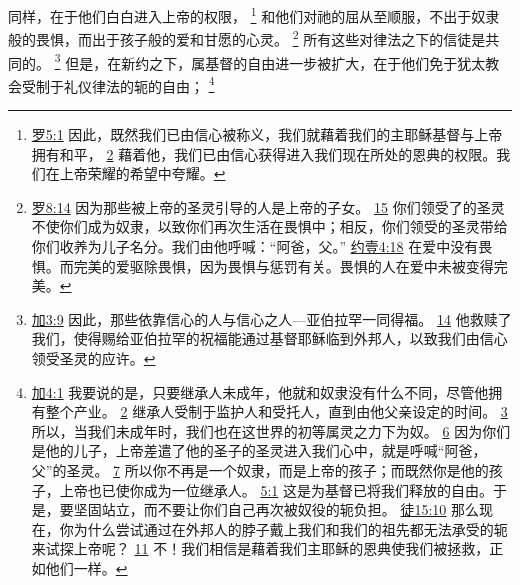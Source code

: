 \documentclass[12pt, a4paper, oneside]{ctexart}
\begin{document}
	同样，在于他们白白进入上帝的权限，
	\footnote {
		\href{https://biblehub.com/romans/5-1.htm}{罗5:1} 因此，既然我们已由信心被称义，我们就藉着我们的主耶稣基督与上帝拥有和平，
		\href{https://biblehub.com/romans/5-2.htm}{2} 藉着他，我们已由信心获得进入我们现在所处的恩典的权限。我们在上帝荣耀的希望中夸耀。

	}
	和他们对祂的屈从至顺服，不出于奴隶般的畏惧，而出于孩子般的爱和甘愿的心灵。
	\footnote {
		\href{https://biblehub.com/romans/8-14.htm}{罗8:14} 因为那些被上帝的圣灵引导的人是上帝的子女。
		\href{https://biblehub.com/romans/8-15.htm}{15} 你们领受了的圣灵不使你们成为奴隶，以致你们再次生活在畏惧中；相反，你们领受的圣灵带给你们收养为儿子名分。我们由他呼喊：“阿爸，父。”
		\href{https://biblehub.com/1_john/4-18.htm}{约壹4:18} 在爱中没有畏惧。而完美的爱驱除畏惧，因为畏惧与惩罚有关。畏惧的人在爱中未被变得完美。
	}
	所有这些对律法之下的信徒是共同的。
	\footnote {
		\href{https://biblehub.com/galatians/3-9.htm}{加3:9} 因此，那些依靠信心的人与信心之人---亚伯拉罕一同得福。
		\href{https://biblehub.com/galatians/3-14.htm}{14} 他救赎了我们，使得赐给亚伯拉罕的祝福能通过基督耶稣临到外邦人，以致我们由信心领受圣灵的应许。
	}
	但是，在新约之下，属基督的自由进一步被扩大，在于他们免于犹太教会受制于礼仪律法的轭的自由；
	\footnote {
		\href{https://biblehub.com/galatians/4-1.htm}{加4:1} 我要说的是，只要继承人未成年，他就和奴隶没有什么不同，尽管他拥有整个产业。
		\href{https://biblehub.com/galatians/4-2.htm}{2} 继承人受制于监护人和受托人，直到由他父亲设定的时间。
		\href{https://biblehub.com/galatians/4-3.htm}{3} 所以，当我们未成年时，我们也在这世界的初等属灵之力下为奴。
		\href{https://biblehub.com/galatians/4-6.htm}{6} 因为你们是他的儿子，上帝差遣了他的圣子的圣灵进入我们心中，就是呼喊“阿爸，父”的圣灵。
		\href{https://biblehub.com/galatians/4-7.htm}{7} 所以你不再是一个奴隶，而是上帝的孩子；而既然你是他的孩子，上帝也已使你成为一位继承人。
		\href{https://biblehub.com/galatians/5-1.htm}{5:1} 这是为基督已将我们释放的自由。于是，要坚固站立，而不要让你们自己再次被奴役的轭负担。
		\href{https://biblehub.com/acts/15-10.htm}{徒15:10} 那么现在，你为什么尝试通过在外邦人的脖子戴上我们和我们的祖先都无法承受的轭来试探上帝呢？
		\href{https://biblehub.com/acts/15-11.htm}{11} 不！我们相信是藉着我们主耶稣的恩典使我们被拯救，正如他们一样。
	}
\end{document}

